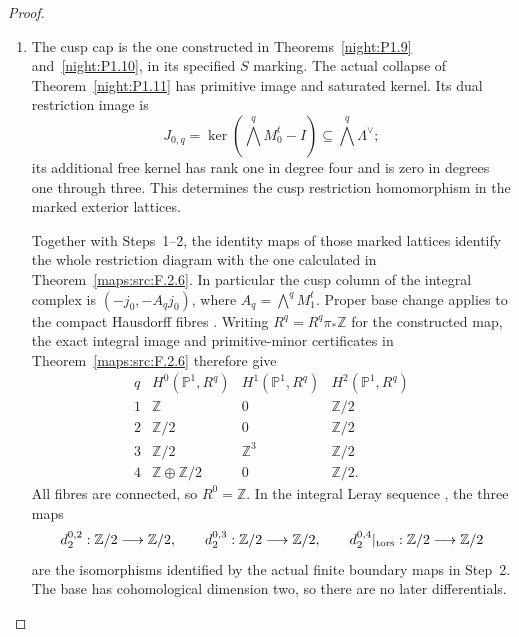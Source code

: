 \begin{proof}
\begin{enumerate}[label=\arabic*.]
These maps identify the finite attaching diagrams with the marked
finite-cover diagrams of Theorem~\ref{maps:src:F.2.6}. In particular
they carry the primitive boundary loops $(g^m h^{-1},g)$, their
subdivided mapping prisms and their integral restriction maps to
the ones in that proof. The induced fibre cohomology map of the
translation is the identity through the specified isotopy. Thus the
three order-four torsion transgressions retain the unit coefficients
computed there.

\item The cusp cap is the one constructed in
Theorems~\ref{night:P1.9} and~\ref{night:P1.10}, in its specified
$S$ marking. The actual collapse of Theorem~\ref{night:P1.11} has
primitive image and saturated kernel. Its dual restriction image is
\[
 J_{0,q}=\ker\!\left(\bigwedge^q M_0^t-I\right)
          \subseteq\bigwedge^q\Lambda^\vee;
\]
its additional free kernel has rank one in degree four and is zero
in degrees one through three. This determines the cusp restriction
homomorphism in the marked exterior lattices.

Together with Steps~1--2, the identity maps of those marked lattices
identify the whole restriction diagram with the one calculated in
Theorem~\ref{maps:src:F.2.6}. In particular the cusp column of the
integral complex is $(-j_0,-A_qj_0)$, where
$A_q=\bigwedge^qM_1^t$. Proper base change applies to the compact
Hausdorff fibres
\cite[Tag 09V5, Lemma 20.18.1; chapter PDF p.~30]{StacksProject}.
Writing $R^q=R^q\pi_*\mathbb Z$ for the constructed map, the exact
integral image and primitive-minor certificates in
Theorem~\ref{maps:src:F.2.6} therefore give
\[
\begin{array}{c|ccc}
q&H^0(\mathbb P^1,R^q)&H^1(\mathbb P^1,R^q)&H^2(\mathbb P^1,R^q)\\\hline
1&\mathbb Z&0&\mathbb Z/2\\
2&\mathbb Z/2&0&\mathbb Z/2\\
3&\mathbb Z/2&\mathbb Z^3&\mathbb Z/2\\
4&\mathbb Z\oplus\mathbb Z/2&0&\mathbb Z/2.
\end{array}
\]
All fibres are connected, so $R^0=\mathbb Z$. In the integral Leray
sequence
\cite[Tag 01F2, Lemma 20.13.4; chapter PDF p.~22]{StacksProject},
the three maps
\[
 d_2^{0,2}:\mathbb Z/2\longrightarrow\mathbb Z/2,
 \qquad
 d_2^{0,3}:\mathbb Z/2\longrightarrow\mathbb Z/2,
 \qquad
 d_2^{0,4}|_{\rm tors}:\mathbb Z/2\longrightarrow\mathbb Z/2
\]
are the isomorphisms identified by the actual finite boundary maps
in Step~2. The base has cohomological dimension two, so there are no
later differentials.


\end{enumerate}
\end{proof}
